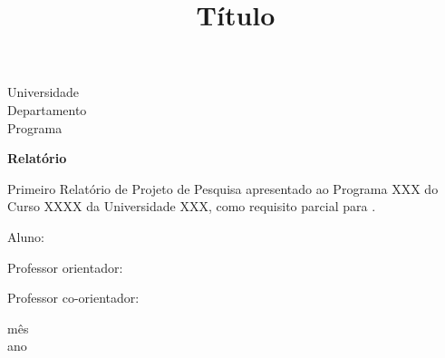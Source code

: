 \documentclass[a4paper, 12pt]{article}
\begin{document}
\begin{titlepage}
	\begin{center}
	

		\Huge{Universidade}\\
		\large{Departamento}\\ 
		\large{Programa}\\ 
\vspace{15pt}
        
        \vspace{85pt}
        
		\textbf{\LARGE{Relatório}}
		\title{\large{Título}}
			
	\end{center}
\vspace{1,5cm}
	
	\begin{flushright}

   \begin{list}{}{
      \setlength{\leftmargin}{4.5cm}
      \setlength{\rightmargin}{0cm}
      \setlength{\labelwidth}{0pt}
      \setlength{\labelsep}{\leftmargin}}

      \item Primeiro Relatório de Projeto de Pesquisa apresentado ao Programa XXX do Curso XXXX da Universidade XXX, como requisito parcial para .

      \begin{list}{}{
      \setlength{\leftmargin}{0cm}
      \setlength{\rightmargin}{0cm}
      \setlength{\labelwidth}{0pt}
      \setlength{\labelsep}{\leftmargin}}

			\item Aluno: \
            \item Professor orientador: \
      		\item Professor co-orientador: \

      \end{list}
   \end{list}
\end{flushright}
\vspace{1cm}
\begin{center}
		\vspace{\fill}
		 mês\\
		 ano
			\end{center}
\end{titlepage}
\end{document}
